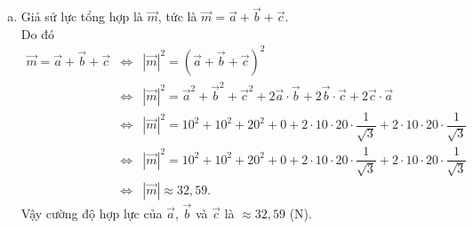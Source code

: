 \begin{ex}
{\begin{enumerate}[a)]
\begin{itemize}
	 Suy ra $\big|\vec{a}+\vec{c}\big|=\sqrt{500+\dfrac{400\sqrt{3}}{3}}$.
	 \item [$\bullet$] $\big(\vec{b}+\vec{c}\big)^2=|\vec{b}|^2+2\vec{b} \cdot \vec{c}+|\vec{c}|^2=10^2+2.10.20.\dfrac{1}{\sqrt{3}}+20^2=500+\dfrac{400\sqrt{3}}{3}$.\\
	 Suy ra $\big|\vec{b}+\vec{c}\big|=\sqrt{500+\dfrac{400\sqrt{3}}{3}}$.
	 \end{itemize}
	 Vậy $\big|\vec{a}+\vec{c}\big|=\big|\vec{b}+\vec{c}\big|$.
	\item Giả sử lực tổng hợp là $\vec{m}$, tức là $\vec{m}=\vec{a}+\vec{b}+\vec{c}$.\\
	 Do đó
	 \allowdisplaybreaks
	 \begin{eqnarray*}
	 \vec{m}=\vec{a}+\vec{b}+\vec{c} &\Leftrightarrow& \left|\vec{m}\right|^2= \left(\vec{a}+\vec{b}+\vec{c}\right)^2\\
	 &\Leftrightarrow& \left|\vec{m}\right|^2= \vec{a}^2+\vec{b}^2+\vec{c}^2+2\vec{a}\cdot\vec{b}+2\vec{b}\cdot\vec{c}+2\vec{c}\cdot\vec{a}\\
	 &\Leftrightarrow& \left|\vec{m}\right|^2= 10^2+10^2+20^2+0+2\cdot 10\cdot 20 \cdot \dfrac{1}{\sqrt3} +2\cdot 10\cdot 20 \cdot \dfrac{1}{\sqrt3}\\
	 &\Leftrightarrow& \left|\vec{m}\right|^2= 10^2+10^2+20^2+0+2\cdot 10\cdot 20 \cdot \dfrac{1}{\sqrt3} +2\cdot 10\cdot 20 \cdot \dfrac{1}{\sqrt3}\\
	 &\Leftrightarrow& \left|\vec{m}\right| \approx 32{,}59.
	 \end{eqnarray*}
	 Vậy cường độ hợp lực của $\vec{a}$, $\vec{b}$ và $\vec{c}$ là $\approx 32{,}59$ (N).
	\end{enumerate}
	}
\end{ex} 
